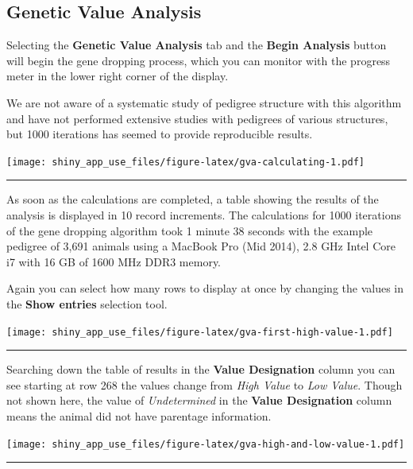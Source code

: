\documentclass[
]{article}
\begin{document}
\hypertarget{genetic-value-analysis}{%
\subsection{Genetic Value Analysis}\label{genetic-value-analysis}}

Selecting the \textbf{Genetic Value Analysis} tab and the \textbf{Begin
Analysis} button will begin the gene dropping process, which you can
monitor with the progress meter in the lower right corner of the
display.

We are not aware of a systematic study of pedigree structure with this
algorithm and have not performed extensive studies with pedigrees of
various structures, but 1000 iterations has seemed to provide
reproducible results.

\texttt{[image: shiny\_app\_use\_files/figure-latex/gva-calculating-1.pdf]}

\begin{center}\rule{0.5\linewidth}{\linethickness}\end{center}

As soon as the calculations are completed, a table showing the results
of the analysis is displayed in 10 record increments. The calculations
for 1000 iterations of the gene dropping algorithm took 1 minute 38
seconds with the example pedigree of 3,691 animals using a MacBook Pro
(Mid 2014), 2.8 GHz Intel Core i7 with 16 GB of 1600 MHz DDR3 memory.

Again you can select how many rows to display at once by changing the
values in the \textbf{Show entries} selection tool.

\texttt{[image: shiny\_app\_use\_files/figure-latex/gva-first-high-value-1.pdf]}

\begin{center}\rule{0.5\linewidth}{\linethickness}\end{center}

Searching down the table of results in the \textbf{Value Designation}
column you can see starting at row 268 the values change from \emph{High
Value} to \emph{Low Value}. Though not shown here, the value of
\emph{Undetermined} in the \textbf{Value Designation} column means the
animal did not have parentage information.

\texttt{[image: shiny\_app\_use\_files/figure-latex/gva-high-and-low-value-1.pdf]}

\begin{center}\rule{0.5\linewidth}{\linethickness}\end{center}
\end{document}
